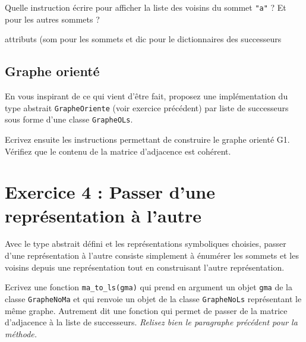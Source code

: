 \documentclass[12pt]{book}
\begin{document}
\Quest Quelle instruction écrire pour afficher la liste des voisins du sommet \texttt{"a"} ? Et pour les autres sommets ?

\begin{sol}
 attributs (som pour les sommets et dic pour le dictionnaires des successeurs
\Quest {}
\Quest 
\Quest {}
\Quest {}
\Quest {}
\end{sol}

\subsection{Graphe orienté}\label{graphe-orientuxe9}

\Quest En vous inspirant de ce qui vient d'être fait, proposez une implémentation du type abstrait \texttt{GrapheOriente} (voir exercice précédent) par liste de successeurs sous forme d'une classe \texttt{GrapheOLs}.


\Quest Ecrivez ensuite les instructions permettant de construire le graphe orienté G1. Vérifiez que le contenu de la matrice d'adjacence est cohérent.

\begin{sol}
\Quest {}
\Quest {}
\end{sol}


\newpage
\section{Exercice 4 : Passer d'une représentation à l'autre}\label{exercice-5-passer-dune-repruxe9sentation-uxe0-lautre}

Avec le type abstrait défini et les représentations symboliques choisies, passer d'une représentation à l'autre consiste simplement à énumérer les sommets et les voisins depuis une représentation tout en construisant l'autre représentation.

\Quest Ecrivez une fonction \texttt{ma\_to\_ls(gma)} qui prend en argument un objet \texttt{gma} de la classe \texttt{GrapheNoMa} et qui renvoie un objet de la classe \texttt{GrapheNoLs} représentant le même graphe. Autrement dit une fonction qui permet de passer de la matrice d'adjacence à la liste de successeurs. \emph{Relisez bien le paragraphe précédent pour la méthode.}
\end{document}
